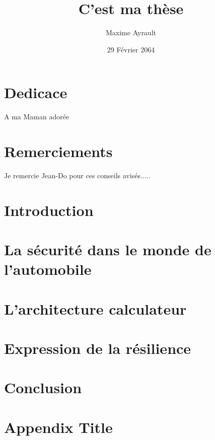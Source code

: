 \documentclass[12pt]{report}
\title{C'est ma th\`ese}
\author{Maxime Ayrault}
\date{29 F\'evrier 2064}
\begin{document}





\chapter*{Dedicace}
A ma Maman ador\'ee

\chapter*{Remerciements}
Je remercie Jean-Do pour ces conseils avis\'es.....

\tableofcontents

\listoffigures

\listoftables


\chapter{Introduction}


\chapter{La s\'ecurit\'e dans le monde de l'automobile}


\chapter{L'architecture calculateur}


\chapter{Expression de la r\'esilience}


\chapter{Conclusion}


\appendix
\chapter{Appendix Title}



\printbibliography
\end{document}
